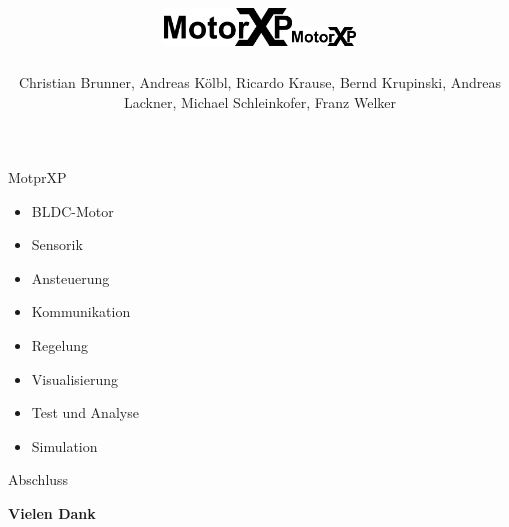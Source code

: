\documentclass[14pt]{beamer}
\title{\includegraphics[height=1cm]{../images/MotorXP}}
\author{Christian Brunner, Andreas Kölbl, Ricardo Krause, Bernd Krupinski, Andreas Lackner, Michael Schleinkofer, Franz Welker}
\begin{document}
\begingroup
\makeatletter
\setlength{\hoffset}{-.5\beamer@sidebarwidth}
\makeatother
\begin{frame}[plain]
  \titlepage
\end{frame}
\endgroup
  \title{\includegraphics[height=0.5cm]{../images/MotorXP}}
  \author{}

\begin{frame}{MotprXP}
\begin{itemize}
	\item BLDC-Motor
	\item Sensorik
	\item Ansteuerung
	\item Kommunikation
	\item Regelung
	\item Visualisierung
	\item Test und Analyse
	\item Simulation
\end{itemize}
\end{frame}











\begin{frame}{Abschluss}
\centering 
	\begin{huge}
		\textbf{Vielen Dank}
	\end{huge}
\end{frame}
\end{document}
